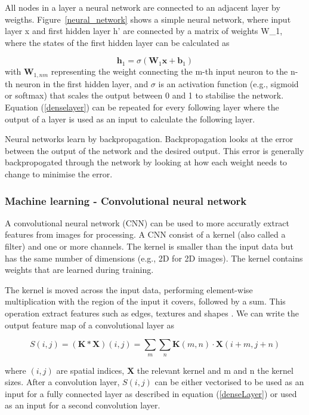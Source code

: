 \documentclass{article}
\begin{document}
All nodes in a layer a neural network are connected to an adjacent layer by weigths. Figure~\ref{neural_network} shows a simple neural network, where input layer x and first hidden layer h' are connected by a matrix of weights W\_1, where the states of the first hidden layer can be calculated as

\begin{equation}
\label{denseLayer}
\mathbf{h}_1 = \sigma(\mathbf{W}_1 \mathbf{x} + \mathbf{b}_1)
\end{equation}
with $\mathbf{W}_{1,nm}$ representing the weight connecting the m-th input neuron to the n-th neuron in the first hidden layer, and $\sigma$ is an activation function (e.g., sigmoid or softmax) that scales the output between 0 and 1 to stabilise the network. Equation (\ref{denselayer}) can be repeated for every following layer where the output of a layer is used as an input to calculate the following layer.

Neural networks learn by backpropagation. Backpropagation looks at the error between the output of the network and the desired output. This error is generally backpropogated through the network by looking at how each weight needs to change to minimise the error.

\subsubsection{Machine learning - Convolutional neural network}

A convolutional neural network (CNN) can be used to more accuratly extract features from images for processing. A CNN consist of a kernel (also called a filter) and one or more channels. The kernel is smaller than the input data but has the same number of dimensions (e.g., 2D for 2D images). The kernel contains weights that are learned during training.

The kernel is moved across the input data, performing element-wise multiplication with the region of the input it covers, followed by a sum. This operation extract features such as edges, textures and shapes \citep{yamashita2018convolutional}. We can write the output feature map of a convolutional layer as

\begin{equation}
S(i, j) = (\mathbf{K} * \mathbf{X})(i, j) = \sum_m \sum_n \mathbf{K}(m, n) \cdot \mathbf{X}(i + m, j + n)
\end{equation}

where $(i,j)$ are spatial indices, $\mathbf{X}$ the relevant kernel and m and n the kernel sizes. After a convolution layer, $S(i, j)$ can be either vectorised to be used as an input for a fully connected layer as described in equation (\ref{denseLayer}) or used as an input for a second convolution layer.
\end{document}
